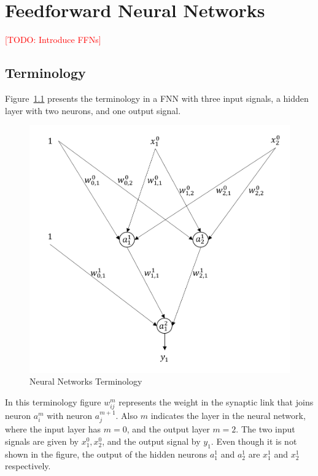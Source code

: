
\chapter{Feedforward Neural Networks} %

\label{AppendixA} %

\textcolor{red} {[TODO: Introduce FFNs] }

\section{Terminology}

Figure~\ref{fig:Terminology} presents the terminology in a FNN with three input signals, a hidden layer with two neurons, and one output signal.

\begin{figure}[h]
	\centering
	\includegraphics{Figures/ffn_v1.PNG}
	\decoRule
	\caption[Neural Networks Terminology]{Neural Networks Terminology}
	\label{fig:Terminology}
\end{figure} 


In this terminology figure $w^{m}_{ij}$ represents the weight in the synaptic link that joins neuron $a^{m}_{i}$ with neuron $a^{m+1}_{j}$. Also $m$ indicates the layer in the neural network, where the input layer has $m=0$, and the output layer $m=2$. The two input signals are given by $x^{0}_{1}, x^{0}_{2}$, and the output signal by $y_1$. Even though it is not shown in the figure, the output of the hidden neurons  $a^{1}_{1}$ and $a^{1}_{2}$ are $x^{1}_{1}$ and $x^{1}_{2}$ respectively.

